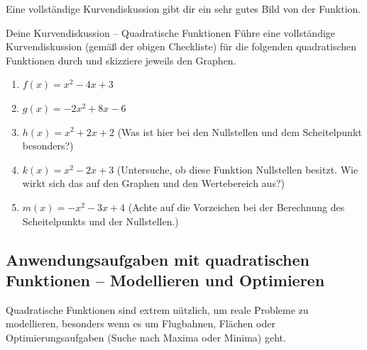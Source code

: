 Eine vollständige Kurvendiskussion gibt dir ein sehr gutes Bild von der Funktion.

\begin{aufgabenumgebung}{Deine Kurvendiskussion – Quadratische Funktionen}
Führe eine vollständige Kurvendiskussion (gemäß der obigen Checkliste) für die folgenden quadratischen Funktionen durch und skizziere jeweils den Graphen.
\begin{enumerate}
    \item $f(x) = x^2 - 4x + 3$
    \item $g(x) = -2x^2 + 8x - 6$
    \item $h(x) = x^2 + 2x + 2$ (Was ist hier bei den Nullstellen und dem Scheitelpunkt besonders?)
    \item $k(x) = x^2 - 2x + 3$ (Untersuche, ob diese Funktion Nullstellen besitzt. Wie wirkt sich das auf den Graphen und den Wertebereich aus?)
    \item $m(x) = -x^2 - 3x + 4$ (Achte auf die Vorzeichen bei der Berechnung des Scheitelpunkts und der Nullstellen.)
\end{enumerate}
\end{aufgabenumgebung}

\subsection{Anwendungsaufgaben mit quadratischen Funktionen – Modellieren und Optimieren}

Quadratische Funktionen sind extrem nützlich, um reale Probleme zu modellieren, besonders wenn es um Flugbahnen, Flächen oder Optimierungsaufgaben (Suche nach Maxima oder Minima) geht.

